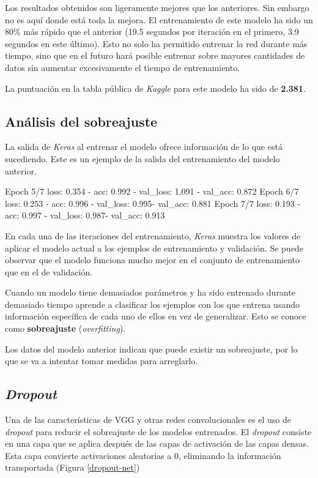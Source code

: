 Los resultados obtenidos son ligeramente mejores que los anteriores. Sin
embargo no es aquí donde está toda la mejora. El entrenamiento de este modelo
ha sido un 80\% más rápido que el anterior (19.5 segundos por iteración en el
primero, 3.9 segundos en este último). Esto no solo ha permitido entrenar la
red durante más tiempo, sino que en el futuro hará posible entrenar sobre
mayores cantidades de datos sin aumentar excesivamente el tiempo de entrenamiento.

La puntuación en la tabla pública de \textit{Kaggle} para este modelo ha sido
de \textbf{2.381}.

\subsection{Análisis del sobreajuste}

La salida de \textit{Keras} al entrenar el modelo ofrece información de lo que
está sucediendo. Este es un ejemplo de la salida del entrenamiento del modelo
anterior.

\begin{python}
Epoch 5/7
loss: 0.354 - acc: 0.992 - val_loss: 1.091 - val_acc: 0.872
Epoch 6/7
loss: 0.253 - acc: 0.996 - val_loss: 0.995- val_acc: 0.881
Epoch 7/7
loss: 0.193 - acc: 0.997 - val_loss: 0.987- val_acc: 0.913
\end{python}

En cada una de las iteraciones del entrenamiento, \textit{Keras} muestra los
valores de aplicar el modelo actual a los ejemplos de entrenamiento y
validación. Se puede observar que el modelo funciona mucho mejor en el conjunto
de entrenamiento que en el de validación.

Cuando un modelo tiene demasiados parámetros y ha sido entrenado durante demasiado tiempo aprende a clasificar los ejemplos con los que entrena usando información específica de cada uno de ellos en vez de generalizar. Esto se conoce como \textbf{sobreajuste} (\textit{overfitting}).

Los datos del modelo anterior indican que puede existir un sobreajuste, por lo que se va a intentar tomar medidas para arreglarlo.

\subsection{\textit{Dropout}}
\label{sec:dropout}

Una de las características de VGG y otras redes convolucionales es el uso de
\textit{dropout} para reducir el sobreajuste de los modelos entrenados. El
\textit{dropout} consiste en una capa que se aplica después de las capas de
activación de las capas densas. Esta capa convierte activaciones aleatorias a
0, eliminando la información transportada (Figura \ref{dropout-net})

